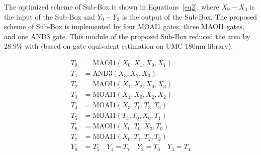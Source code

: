 \documentclass[final,5p,times,twocolumn]{elsarticle}
\begin{document}
The optimized scheme of Sub-Box is shown in Equations~\ref{eq2}, where $X_0-X_3$ is the input of the Sub-Box and $Y_0-Y_3$ is the output of the Sub-Box.
The proposed scheme of Sub-Box is implemented by four MOAI1 gates, three MAOI1 gates, and one AND3 gate.
This module of the proposed Sub-Box reduced the area by 28.9\% with \cite{bao2019peigen} (based on gate equivalent estimation on UMC 180nm library).

\begin{align}
    T_0 & = \text{MAOI1}(X_0, X_1, X_0, X_1) \nonumber          \\
    T_1 & = \text{AND3}(X_3, X_2, X_3) \nonumber                \\
    T_2 & = \text{MAOI1}(X_1, X_2, X_0, X_3) \nonumber          \\
    T_3 & = \text{MOAI1}(X_1, X_0, X_2, X_2) \nonumber          \\
    T_4 & = \text{MOAI1}(X_3, T_0, T_3, T_3) \label{eq2}        \\
    T_5 & = \text{MOAI1}(T_3, T_0, X_0, T_1) \nonumber          \\
    T_6 & = \text{MAOI1}(X_0, T_0, X_3, T_0) \nonumber          \\
    T_7 & = \text{MOAI1}(X_0, T_1, T_2, T_2) \nonumber          \\
    Y_0 & = T_5 \quad Y_1 = T_7 \quad Y_2 = T_6 \quad Y_3 = T_4
    \nonumber
\end{align}
\end{document}
